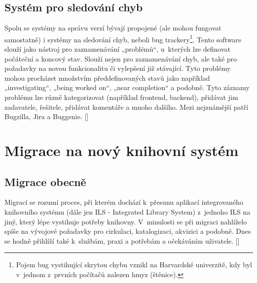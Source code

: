 \documentclass[
	11pt, oneside, printed, final, palatino, monochrome
	microtype,
	table,   %
	lof,     %
	lot     %
]{fithesis3}
\newcommand{\citepages}[2]{[\cite[#1]{#2}]}
\begin{document}
{\subsection{Systém pro sledování chyb}
Spolu se systémy na správu verzí bývají propojené (ale mohou fungovat samostatně) i systémy na sledování chyb, neboli bug trackery\footnote{Pojem bug vystihující skrytou chybu vznikl na Harvardské univerzitě, kdy byl v~jednom z~prvních počítačů nalezen hmyz (štěnice).}. Tento software slouží jako nástroj pro zaznamenávání „problémů“, u~kterých lze definovat počáteční a koncový stav. Slouží nejen pro zaznamenávání chyb, ale také pro požadavky na novou funkcionalitu či vylepšení již stávající. Tyto problémy mohou procházet množstvím předdefinovaných stavů jako například „investigating“, „being worked on“, „near completion“ a podobně. Tyto záznamy problému lze různě kategorizovat (například frontend, backend), přidávat jim zadavatele, řešitele, přidávat komentáře a mnoho dalšího. Mezi nejznámější patří Bugzilla, Jira a Buggenie. \citepages{99-104}{Fogel2012}

\section{Migrace na nový knihovní systém}

\subsection{Migrace obecně}

Migrací se rozumí proces, při kterém dochází k~přesunu aplikací integrovaného knihovního systému (dále jen ILS - Integrated Library System) z~jednoho ILS na jiný, který lépe vystihuje potřeby knihovny. V~minulosti se při migraci nahlíželo spíše na vývojové požadavky pro cirkulaci, katalogizaci, akvizici a podobně. Dnes se hodně přihlíží také k~službám, praxi a potřebám a očekáváním uživatele. \citepages{151-152}{bilal_2014}

}
\end{document}
